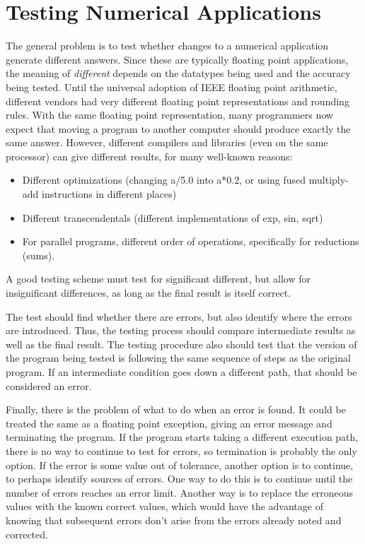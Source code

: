 \section{Testing Numerical Applications}

The general problem is to test whether changes to a numerical application generate different answers.
Since these are typically floating point applications, the meaning of \emph{different} depends on the datatypes being used and the accuracy being tested.
Until the universal adoption of IEEE floating point arithmetic\cite{goldberg.cs.91}, different vendors had very different floating point representations and rounding rules.
With the same floating point representation, many programmers now expect that moving a program to another computer should produce exactly the same answer.
However, different compilers and libraries (even on the same processor) can give different results, for many well-known reasons:
\begin{itemize}
\item Different optimizations (changing a/5.0 into a*0.2, or using fused multiply-add instructions in different places)
\item Different transcendentals (different implementations of exp, sin, sqrt)
\item For parallel programs, different order of operations, specifically for reductions (sums).
\end{itemize}
A good testing scheme must test for significant different, but allow for insignificant differences, as long as the final result is itself correct.

The test should find whether there are errors, but also identify where the errors are introduced.
Thus, the testing process should compare intermediate results as well as the final result.
The testing procedure also should test that the version of the program being tested is following the same sequence of steps as the original program.
If an intermediate condition goes down a different path, that should be considered an error.

Finally, there is the problem of what to do when an error is found.
It could be treated the same as a floating point exception, giving an error message and terminating the program.
If the program starts taking a different execution path, there is no way to continue to test for errors, so termination is probably the only option.
If the error is some value out of tolerance, another option is to continue, to perhaps identify sources of errors.
One way to do this is to continue until the number of errors reaches an error limit.
Another way is to replace the erroneous values with the known correct values, which would have the advantage of knowing that subsequent errors don't arise from the errors already noted and corrected.

